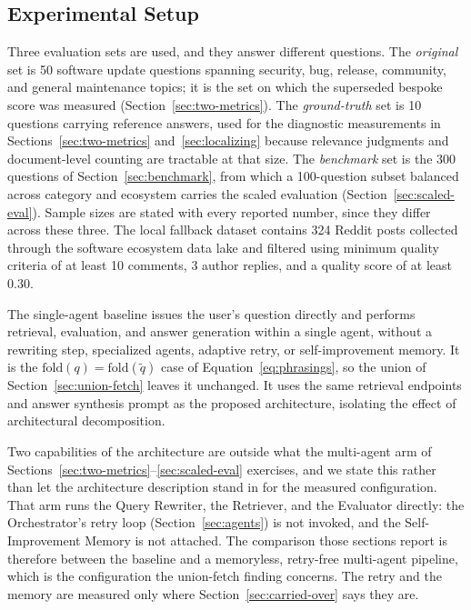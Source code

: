 \documentclass[acmsmall,review,anonymous,screen]{acmart}
\begin{document}
\subsection{Experimental Setup}\label{sec:setup}

Three evaluation sets are used, and they answer different questions.
The \emph{original} set is 50 software update questions spanning security, bug,
release, community, and general maintenance topics; it is the set on which the
superseded bespoke score was measured (Section~\ref{sec:two-metrics}). The
\emph{ground-truth} set is 10 questions carrying reference answers, used for the
diagnostic measurements in Sections~\ref{sec:two-metrics}
and~\ref{sec:localizing} because relevance judgments and document-level counting
are tractable at that size. The \emph{benchmark} set is the 300 questions of
Section~\ref{sec:benchmark}, from which a 100-question subset balanced across
category and ecosystem carries the scaled evaluation
(Section~\ref{sec:scaled-eval}). Sample sizes are stated with every reported
number, since they differ across these three. The local fallback dataset contains 324 Reddit
posts collected through the software ecosystem data lake and filtered
using minimum quality criteria of at least 10 comments, 3 author
replies, and a quality score of at least 0.30.

The single-agent baseline issues the user's question directly and performs
retrieval, evaluation, and answer generation within a single agent, without a
rewriting step, specialized agents, adaptive retry, or self-improvement memory.
It is the $\mathrm{fold}(q) = \mathrm{fold}(\tilde{q})$ case of
Equation~\eqref{eq:phrasings}, so the union of
Section~\ref{sec:union-fetch} leaves it unchanged. It
uses the same retrieval endpoints and answer synthesis prompt as the
proposed architecture, isolating the effect of architectural
decomposition.

Two capabilities of the architecture are outside what the multi-agent arm of
Sections~\ref{sec:two-metrics}--\ref{sec:scaled-eval} exercises, and we state
this rather than let the architecture description stand in for the measured
configuration. That arm runs the Query Rewriter, the Retriever, and the
Evaluator directly: the Orchestrator's retry loop
(Section~\ref{sec:agents}) is not invoked, and the Self-Improvement Memory is
not attached. The comparison those sections report is therefore between the
baseline and a memoryless, retry-free multi-agent pipeline, which is the
configuration the union-fetch finding concerns. The retry and the memory are
measured only where Section~\ref{sec:carried-over} says they are.
\end{document}
